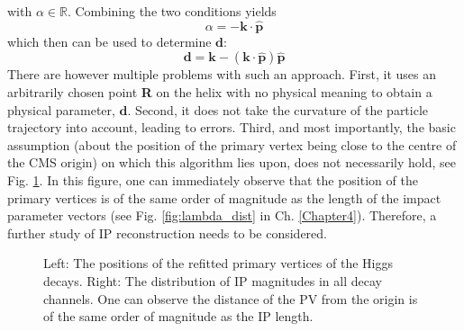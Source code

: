 with $\alpha \in \mathbb{R}$. Combining the two conditions yields
\begin{equation}
	\alpha = -\boldsymbol{k}\cdot\boldsymbol{\hat{p}}
\end{equation}
which then can be used to determine $\boldsymbol{d}$:
\begin{equation}
	\label{ansatz_sol_Claudia}
	\boldsymbol{d} = \boldsymbol{k}-(\boldsymbol{k}\cdot\boldsymbol{\hat{p}})\boldsymbol{\hat{p}}
\end{equation}
There are however multiple problems with such an approach. First, it uses an arbitrarily chosen point \textbf{R} on the helix with no physical meaning to obtain a physical parameter, $\boldsymbol{d}$. Second, it does not take the curvature of the particle trajectory into account, leading to errors. Third, and most importantly, the basic assumption (about the position of the primary vertex being close to the centre of the CMS origin) on which this algorithm lies upon, does not necessarily hold, see Fig. \ref{fig:PVs}. In this figure, one can immediately observe that the position of the primary vertices is of the same order of magnitude as the length of the impact parameter vectors (see Fig. \ref{fig:lambda_dist} in Ch. \ref{Chapter4}). Therefore, a further study of IP reconstruction needs to be considered.\\
\begin{figure}[h]
	\centering
	\caption{Left: The positions of the refitted primary vertices of the Higgs decays. Right: The distribution of IP magnitudes in all decay channels. One can observe the distance of the PV from the origin is of the same order of magnitude as the IP length.}
	\label{fig:PVs}
\end{figure}
\newpage
